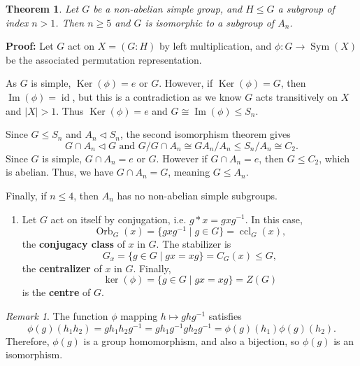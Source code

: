 \documentclass[12pt]{article}
\DeclareMathOperator{\Ker}{Ker}
\DeclareMathOperator{\Img}{Im}
\DeclareMathOperator{\id}{id}
\DeclareMathOperator{\Sym}{Sym}
\DeclareMathOperator{\Orb}{Orb}
\DeclareMathOperator{\ccl}{ccl}
\newtheorem{theorem}{Theorem}[section]
\theoremstyle{definition}
\theoremstyle{remark}
\newtheorem*{remark}{Remark}
\begin{document}
\begin{theorem}
	Let $G$ be a non-abelian simple group, and $H \leq G$ a subgroup of index $n > 1$. Then $n \geq 5$ and $G$ is isomorphic to a subgroup of $A_n$.
\end{theorem}

\begin{adjustbox}{minipage = \columnwidth - 25.5pt, margin=1em, frame=1pt, margin=0em}
\textbf{Proof:} Let $G$ act on $X = (G:H)$ by left multiplication, and $\phi : G \to \Sym(X)$ be the associated permutation representation.

As $G$ is simple, $\Ker(\phi) = e$ or $G$. However, if $\Ker(\phi) = G$, then $\Img(\phi) = \id$, but this is a contradiction as we know $G$ acts transitively on $X$ and $|X| > 1$. Thus $\Ker(\phi) = e$ and $G \cong \Img(\phi) \leq S_n$.

Since $G \leq S_n$ and $A_n \lhd S_n$, the second isomorphism theorem gives
\[
	G \cap A_n \lhd G \text{ and } G/G \cap A_n \cong GA_n/A_n \leq S_n/A_n \cong C_2
.\]
Since $G$ is simple, $G \cap A_n = e$ or $G$. However if $G \cap A_n = e$, then $G \leq C_2$, which is abelian. Thus, we have $G \cap A_n = G$, meaning $G \leq A_n$.

Finally, if $n \leq 4$, then $A_n$ has no non-abelian simple subgroups.

\end{adjustbox}



\begin{enumerate}[resume, label = (\roman*)]
	\item Let $G$ act on itself by conjugation, i.e. $g \ast x = g x g^{-1}$. In this case,
		\[
			\Orb_G(x) = \{gxg^{-1} \mid g \in G\} = \ccl_G(x)
		,\]
		the \textbf{conjugacy class} of $x$ in $G$. The stabilizer is
		\[
			G_x = \{g \in G \mid gx = xg\} = C_G(x) \leq G
		,\]
		the \textbf{centralizer} of $x$ in $G$. Finally,
		\[
			\ker(\phi) = \{g \in G \mid gx = xg\} = Z(G)
		\]
		is the \textbf{centre} of $G$.
\end{enumerate}

\begin{remark}
	The function $\phi$ mapping $h \mapsto ghg^{-1}$ satisfies
	\[
		\phi(g)(h_1h_2) = gh_1h_2g^{-1} = gh_1g^{-1}gh_2g^{-1} = \phi(g)(h_1) \phi(g)(h_2)
	.\]
	Therefore, $\phi(g)$ is a group homomorphism, and also a bijection, so $\phi(g)$ is an isomorphism.
\end{remark}
\end{document}
